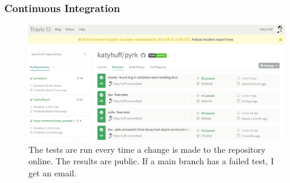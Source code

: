 \begin{frame}[fragile]
  \frametitle{Continuous Integration}
  \begin{figure}[htbp!]
    \begin{center}
    \includegraphics[height=0.6\textheight]{./progress/travis_pyrk.png}
    \end{center}
    \caption{The tests are run every time a change is made to the repository
    online. The results are public. If a main branch has a failed test, I get
    an email.}
    \label{fig:tests_pyrk}
  \end{figure}
\end{frame}

